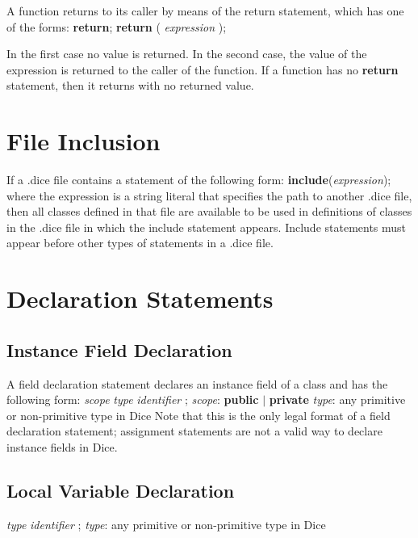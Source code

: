 \begin{homeworkProblem}
    A function returns to its caller by means of the return statement, which has one of the forms:
    \newline
    \newline
		\textbf{return};
    \newline
    \textbf{return} ( \textit{expression} );

        In the first case no value is returned. In the second case, the value of the expression is returned to the caller of the function. If a function has no \textbf{return} statement, then it returns with no returned value. 

	\section{File Inclusion}
	If a .dice file contains a statement of the following form:
    \newline
	\textbf{include}(\textit{expression});
	\newline
    where the expression is a string literal that specifies the path to another .dice file, then all classes defined in that file are available to be used in definitions of classes in the .dice file in which the include statement appears. Include statements must appear before other types of statements in a .dice file.
	
	\section{Declaration Statements}
    \subsection{Instance Field Declaration}
	A field declaration statement declares an instance field of a class and has the following form:
    \newline
    \textit{scope} \textit{type} \textit{identifier} ;
    \newline
    \textit{scope}: \textbf{public} $|$ \textbf{private}
	\newline
    \textit{type}: any primitive or non-primitive type in Dice
    \newline
    Note that this is the only legal format of a field declaration statement; assignment statements are not a valid way to declare instance fields in Dice.

    \subsection{Local Variable Declaration}
    \textit{type} \textit{identifier} ;
    \newline
    \textit{type}: any primitive or non-primitive type in Dice


\end{homeworkProblem}
